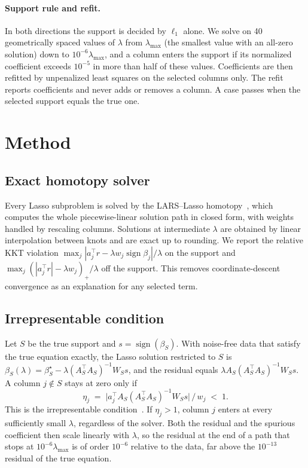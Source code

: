\documentclass{article}
\begin{document}
\paragraph{Support rule and refit.}
In both directions the support is decided by $\ell_1$ alone. We solve on 40 geometrically spaced values of $\lambda$ from $\lambda_{\max}$ (the smallest value with an all-zero solution) down to $10^{-6}\lambda_{\max}$, and a column enters the support if its normalized coefficient exceeds $10^{-5}$ in more than half of these values. Coefficients are then refitted by unpenalized least squares on the selected columns only. The refit reports coefficients and never adds or removes a column. A case passes when the selected support equals the true one.

\section{Method}
\label{sec:method}

\subsection{Exact homotopy solver}
\label{sec:lars}
Every Lasso subproblem is solved by the LARS--Lasso homotopy~\citep{efron2004lars}, which computes the whole piecewise-linear solution path in closed form, with weights handled by rescaling columns. Solutions at intermediate $\lambda$ are obtained by linear interpolation between knots and are exact up to rounding. We report the relative KKT violation $\max_j |a_j^\top r - \lambda w_j \operatorname{sign}\beta_j|/\lambda$ on the support and $\max_j(|a_j^\top r| - \lambda w_j)_+/\lambda$ off the support. This removes coordinate-descent convergence as an explanation for any selected term.

\subsection{Irrepresentable condition}
\label{sec:irrep}
Let $S$ be the true support and $s = \operatorname{sign}(\beta_S)$. With noise-free data that satisfy the true equation exactly, the Lasso solution restricted to $S$ is $\beta_S(\lambda) = \beta_S^\star - \lambda (A_S^\top A_S)^{-1} W_S s$, and the residual equals $\lambda A_S (A_S^\top A_S)^{-1} W_S s$. A column $j\notin S$ stays at zero only if
\begin{equation}
\eta_j \;=\; \bigl| a_j^\top A_S (A_S^\top A_S)^{-1} W_S s \bigr| \,/\, w_j \;<\; 1 .
\label{eq:irrep}
\end{equation}
This is the irrepresentable condition~\citep{zhao2006consistency}. If $\eta_j > 1$, column $j$ enters at every sufficiently small $\lambda$, regardless of the solver. Both the residual and the spurious coefficient then scale linearly with $\lambda$, so the residual at the end of a path that stops at $10^{-6}\lambda_{\max}$ is of order $10^{-6}$ relative to the data, far above the $10^{-13}$ residual of the true equation.
\end{document}
